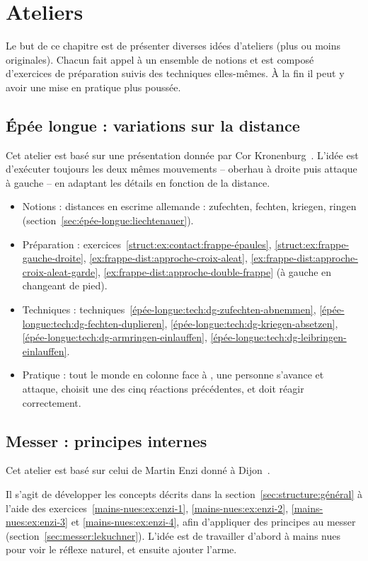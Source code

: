 \chapter{Ateliers}

Le but de ce chapitre est de présenter diverses idées d'ateliers (plus ou moins originales).
Chacun fait appel à un ensemble de notions et est composé d'exercices de préparation suivis des techniques elles-mêmes.
À la fin il peut y avoir une mise en pratique plus poussée.


\section{Épée longue : variations sur la distance}
\label{app:ateliers:épée-longue-variations-distance}

Cet atelier est basé sur une présentation donnée par Cor Kronenburg~\cite{kronenburg:dijon:going_distance:2015}.
L'idée est d'exécuter toujours les deux mêmes mouvements – oberhau à droite puis attaque à gauche – en adaptant les détails en fonction de la distance.

\begin{itemize}
	\item Notions : distances en escrime allemande : zufechten, fechten, kriegen, ringen (section~\ref{sec:épée-longue:liechtenauer}).
	\item Préparation : exercices~\ref{struct:ex:contact:frappe-épaules}, \ref{struct:ex:frappe-gauche-droite}, \ref{ex:frappe-dist:approche-croix-aleat}, \ref{ex:frappe-dist:approche-croix-aleat-garde}, \ref{ex:frappe-dist:approche-double-frappe} (à gauche en changeant de pied).
	\item Techniques : techniques~\ref{épée-longue:tech:dg-zufechten-abnemmen}, \ref{épée-longue:tech:dg-fechten-duplieren}, \ref{épée-longue:tech:dg-kriegen-absetzen}, \ref{épée-longue:tech:dg-armringen-einlauffen}, \ref{épée-longue:tech:dg-leibringen-einlauffen}.
	\item Pratique : tout le monde en colonne face à \D, une personne \A s'avance et attaque, \D choisit une des cinq réactions précédentes, et \A doit réagir correctement.
\end{itemize}


\section{Messer : principes internes}


Cet atelier est basé sur celui de Martin Enzi donné à Dijon~\cite{enzi:dijon:messer_inner:2015}.

Il s'agit de développer les concepts décrits dans la section~\ref{sec:structure:général} à l'aide des exercices~\ref{mains-nues:ex:enzi-1}, \ref{mains-nues:ex:enzi-2}, \ref{mains-nues:ex:enzi-3} et \ref{mains-nues:ex:enzi-4}, afin d'appliquer des principes au messer (section~\ref{sec:messer:lekuchner}).
L'idée est de travailler d'abord à mains nues pour voir le réflexe naturel, et ensuite ajouter l'arme.

